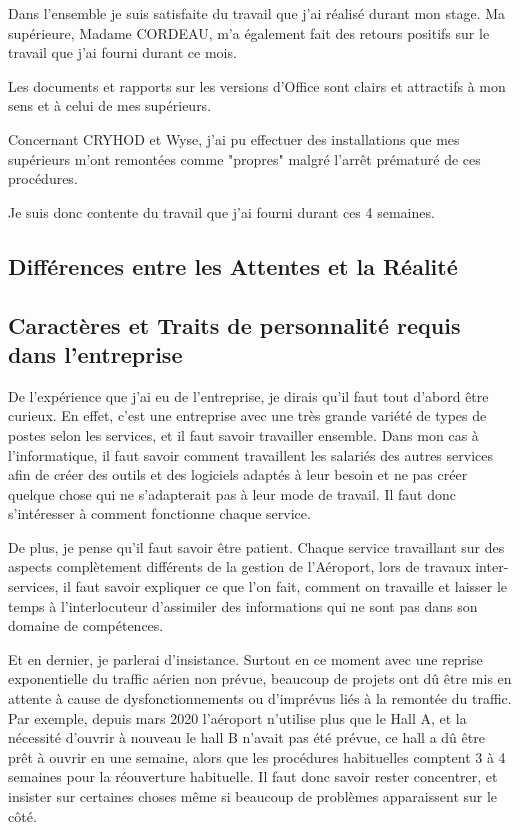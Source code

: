 Dans l'ensemble je suis satisfaite du travail que j'ai réalisé durant mon stage. Ma supérieure, Madame CORDEAU, m'a également fait des retours positifs sur le travail que j'ai fourni durant ce mois.

Les documents et rapports sur les versions d'Office sont clairs et attractifs à mon sens et à celui de mes supérieurs.

Concernant CRYHOD et Wyse, j'ai pu effectuer des installations que mes supérieurs m'ont remontées comme "propres" malgré l'arrêt prématuré de ces procédures.

Je suis donc contente du travail que j'ai fourni durant ces 4 semaines.


\subsection{Différences entre les Attentes et la Réalité}


\subsection{Caractères et Traits de personnalité requis dans l'entreprise}

De l'expérience que j'ai eu de l'entreprise, je dirais qu'il faut tout d'abord être curieux. En effet, c'est une entreprise avec une très grande variété de types de postes selon les services, et il faut savoir travailler ensemble.
Dans mon cas à l'informatique, il faut savoir comment travaillent les salariés des autres services afin de créer des outils et des logiciels adaptés à leur besoin et ne pas créer quelque chose qui ne s'adapterait pas à leur mode de travail.
Il faut donc s'intéresser à comment fonctionne chaque service.\newline

De plus, je pense qu'il faut savoir être patient. Chaque service travaillant sur des aspects complètement différents de la gestion de l'Aéroport, lors de travaux inter-services, il faut savoir expliquer ce que l'on fait, comment on travaille et laisser le temps à l'interlocuteur d'assimiler des informations qui ne sont pas dans son domaine de compétences.\newline

Et en dernier, je parlerai d'insistance. Surtout en ce moment avec une reprise exponentielle du traffic aérien non prévue, beaucoup de projets ont dû être mis en attente à cause de dysfonctionnements ou d'imprévus liés à la remontée du traffic.
Par exemple, depuis mars 2020 l'aéroport n'utilise plus que le Hall A, et la nécessité d'ouvrir à nouveau le hall B n'avait pas été prévue, ce hall a dû être prêt à ouvrir en une semaine, alors que les procédures habituelles comptent 3 à 4 semaines pour la réouverture habituelle.
Il faut donc savoir rester concentrer, et insister sur certaines choses même si beaucoup de problèmes apparaissent sur le côté.

